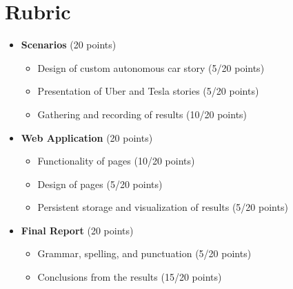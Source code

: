 \documentclass{article}
\begin{document}
\section{Rubric}
\begin{itemize}
  \item \textbf{Scenarios} (20 points)
  \begin{itemize}
    \item Design of custom autonomous car story (5/20 points)
    \item Presentation of Uber and Tesla stories (5/20 points)
    \item Gathering and recording of results (10/20 points)
  \end{itemize}

  \item \textbf{Web Application} (20 points)
  \begin{itemize}
    \item Functionality of pages (10/20 points)
    \item Design of pages (5/20 points)
    \item Persistent storage and visualization of results (5/20 points)
  \end{itemize}

  \item \textbf{Final Report} (20 points)
  \begin{itemize}
    \item Grammar, spelling, and punctuation (5/20 points)
    \item Conclusions from the results (15/20 points)
  \end{itemize}

\end{itemize}



\end{document}
